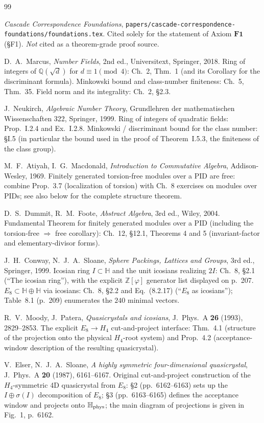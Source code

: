 \documentclass[11pt, a4paper]{amsart}
\theoremstyle{definition}
\newcommand{\Q}{\mathbb{Q}}
\newcommand{\Z}{\mathbb{Z}}
\newcommand{\HH}{\mathbb{H}}
\begin{document}
\begin{thebibliography}{99}

\emph{Cascade Correspondence Foundations},
\texttt{papers/cascade-correspondence-foundations/foundations.tex}.
Cited solely for the statement of Axiom $\mathbf{F1}$ (\S F1).
\emph{Not} cited as a theorem-grade proof source.

D.~A.~Marcus, \emph{Number Fields}, 2nd ed., Universitext,
Springer, 2018. Ring of integers of $\Q(\sqrt d)$ for $d \equiv
1 \pmod 4$: Ch.~2, Thm.~1 (and its Corollary for the
discriminant formula). Minkowski bound and class-number
finiteness: Ch.~5, Thm.~35. Field norm and its integrality:
Ch.~2, \S2.3.

J.~Neukirch, \emph{Algebraic Number Theory}, Grundlehren der
mathematischen Wissenschaften 322, Springer, 1999. Ring of
integers of quadratic fields: Prop.~I.2.4 and Ex.~I.2.8.
Minkowski / discriminant bound for the class number:
\S I.5 (in particular the bound used in the proof of
Theorem~I.5.3, the finiteness of the class group).

M.~F.~Atiyah, I.~G.~Macdonald, \emph{Introduction to Commutative
Algebra}, Addison-Wesley, 1969. Finitely generated torsion-free
modules over a PID are free: combine Prop.~3.7 (localization of
torsion) with Ch.~8 exercises on modules over PIDs; see also
\cite{DummitFoote} below for the complete structure theorem.

D.~S.~Dummit, R.~M.~Foote, \emph{Abstract Algebra}, 3rd ed.,
Wiley, 2004. Fundamental Theorem for finitely generated modules
over a PID (including the torsion-free $\Rightarrow$ free
corollary): Ch.~12, \S12.1, Theorems 4 and 5 (invariant-factor
and elementary-divisor forms).

J.~H.~Conway, N.~J.~A.~Sloane, \emph{Sphere Packings,
Lattices and Groups}, 3rd ed., Springer, 1999. Icosian ring
$I \subset \HH$ and the unit icosians realizing $2I$: Ch.~8,
\S2.1 (``The icosian ring''), with the explicit $\Z[\varphi]$
generator list displayed on p.~207. $E_8 \subset \HH \oplus
\HH$ via icosians: Ch.~8, \S2.2 and Eq.~(8.2.17)
(``$E_8$ as icosians''); Table~8.1 (p.~209) enumerates the
$240$ minimal vectors.

R.~V.~Moody, J.~Patera, \emph{Quasicrystals and icosians},
J.~Phys.~A \textbf{26} (1993), 2829--2853.
The explicit $E_8 \to H_4$ cut-and-project interface: Thm.~4.1
(structure of the projection onto the physical $H_4$-root
system) and Prop.~4.2 (acceptance-window description of the
resulting quasicrystal).

V.~Elser, N.~J.~A.~Sloane, \emph{A highly symmetric
four-dimensional quasicrystal}, J.~Phys.~A \textbf{20} (1987),
6161--6167. Original cut-and-project construction of the
$H_4$-symmetric 4D quasicrystal from $E_8$: \S2 (pp.~6162--6163)
sets up the $I \oplus \sigma(I)$ decomposition of $E_8$;
\S3 (pp.~6163--6165) defines the acceptance window and projects
onto $\HH_{\rm phys}$; the main diagram of projections is given
in Fig.~1, p.~6162.

\end{thebibliography}
\end{document}
